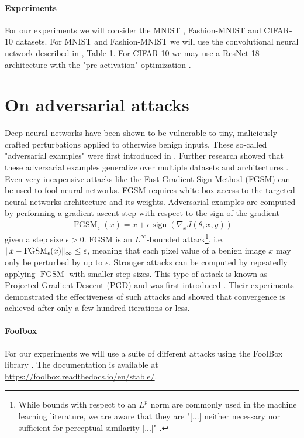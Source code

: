\documentclass{article}
\begin{document}
\paragraph{Experiments}
For our experiments we will consider the MNIST \cite{deng2012mnist}, Fashion-MNIST \cite{xiao2017fashion} and CIFAR-10 \cite{krizhevsky2009learning} datasets. For MNIST and Fashion-MNIST we will use the convolutional neural network described in \cite{carlini2017towards}, Table 1. For CIFAR-10 we may use a ResNet-18 architecture \cite{he2016deep} with the "pre-activation" optimization \cite{he2016identity}. 

	
\section{On adversarial attacks}
Deep neural networks have been shown to be vulnerable to tiny, maliciously crafted perturbations applied to otherwise benign inputs. These so-called "adversarial examples" were first introduced in \cite{Szegedy13}. Further research showed that these adversarial examples generalize over multiple datasets and architectures \cite{goodfellow2014explaining}. Even very inexpensive attacks like the Fast Gradient Sign Method (FGSM) \cite{goodfellow2014explaining} can be used to fool neural networks. FGSM requires white-box access to the targeted neural networks architecture and its weights. Adversarial examples are computed by performing a gradient ascent step with respect to the sign of the gradient
\begin{align*}
	\operatorname{FGSM}_\epsilon(x) = x + \epsilon\operatorname{sign}(\nabla_x J(\theta,x,y)) 
\end{align*}
given a step size $\epsilon>0$. FGSM is an $L^\infty$-bounded attack\footnote{While bounds with respect to an $L^p$ norm are commonly used in the machine learning literature, we are aware that they are "[...] neither necessary nor sufficient for perceptual similarity [...]" \cite{sharif2018suitability}.}, i.e. $\lVert x-\operatorname{FGSM}_\epsilon(x)\rVert_\infty\le\epsilon$, meaning that each pixel value of a benign image $x$ may only be perturbed by up to $\epsilon$.
Stronger attacks can be computed by repeatedly applying $\operatorname{FGSM}$ with smaller step sizes. This type of attack is known as Projected Gradient Descent (PGD) and was first introduced \cite{madry2017towards}. Their experiments demonstrated the effectiveness of such attacks and showed that convergence is achieved after only a few hundred iterations or less. 

\paragraph{Foolbox}
For our experiments we will use a suite of different attacks using the FoolBox library \cite{rauber2017foolbox}. The documentation is available at \url{https://foolbox.readthedocs.io/en/stable/}. 



\end{document}
